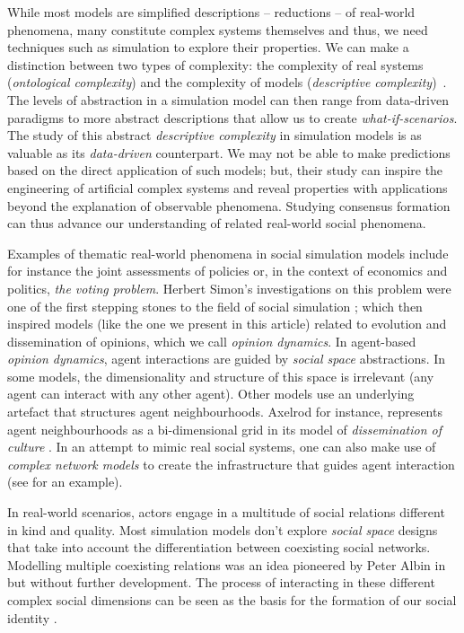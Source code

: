 \documentclass[preprint,number]{elsarticle}
\begin{document}
        While most models are simplified descriptions -- reductions -- of real-world phenomena, many
        constitute complex systems themselves and thus, we need techniques such as simulation to
        explore their properties. We can make a distinction between two types of complexity: the
        complexity of real systems (\textit{ontological complexity}) and the complexity of models
        (\textit{descriptive complexity})~\cite{Emmeche1997}. The levels of abstraction in a
        simulation model can then range from data-driven paradigms to more abstract descriptions
        that allow us to create \textit{what-if-scenarios}. The study of this abstract
        \textit{descriptive complexity} in simulation models is as valuable as its
        \textit{data-driven} counterpart. We may not be able to make predictions based on the direct
        application of such models; but, their study can inspire the engineering of artificial
        complex systems and reveal properties with applications beyond the explanation of observable
        phenomena. Studying consensus formation can thus advance our understanding of related
        real-world social phenomena.

        Examples of thematic real-world phenomena in social simulation models include for instance
        the joint assessments of policies or, in the context of economics and politics, \textit{the
          voting problem}. Herbert Simon's investigations on this problem were one of the first
        stepping stones to the field of social simulation \cite{Simon1954}; which then inspired
        models (like the one we present in this article) related to evolution and dissemination of
        opinions, which we call \textit{opinion dynamics}. In agent-based \textit{opinion dynamics},
        agent interactions are guided by \textit{social space} abstractions. In some models, the
        dimensionality and structure of this space is irrelevant (any agent can interact with any
        other agent). Other models use an underlying artefact that structures agent
        neighbourhoods. Axelrod for instance, represents agent neighbourhoods as a bi-dimensional
        grid in its model of \textit{dissemination of culture} \cite{Axelrod1997}. In an attempt to
        mimic real social systems, one can also make use of \textit{complex network models} to
        create the infrastructure that guides agent interaction (see \cite{Weisbuch2004} for an
        example).
	
	In real-world scenarios, actors engage in a multitude of social relations different in kind
        and quality. Most simulation models don't explore \textit{social space} designs that take
        into account the differentiation between coexisting social networks. Modelling multiple
        coexisting relations was an idea pioneered by Peter Albin in \cite{Albin1975} but without
        further development. The process of interacting in these different complex social dimensions
        can be seen as the basis for the formation of our social identity
        \cite{Roccas2002,Ellemers2002}.
	
\end{document}
